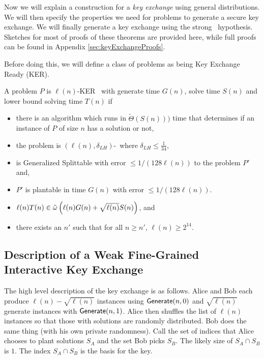 

Now we will explain a construction for a \emph{key exchange} using general distributions. We will then specify the properties we need for problems to generate a secure key exchange. We will finally generate a key exchange using the strong \zkclique~hypothesis. Sketches for most of proofs of these theorems are provided here, while full proofs can be found in Appendix \ref{sec:keyExchangeProofs}.

\newcommand{\keyER}{KER}

Before doing this, we will define a class of problems as being Key Exchange Ready (KER).

\begin{definition}
	A problem $P$ is $\ell(n)$-\keyER~ with generate time $G(n)$, solve time $S(n)$ and lower bound solving time $T(n)$ if
	\begin{itemize}
		\item there is an algorithm which runs in $\tilde\Theta(S(n)))$ time that determines if an instance of $P$ of size $n$ has a solution or not,
		\item the problem is $(\ell(n), \delta_{LH})$-\ACLH~where $\delta_{LH} \le \frac 1 {34}$,
		\item is Generalized Splittable with error $\leq 1/(128 \ell(n))$ to the problem $P'$ and,
		\item $P'$ is plantable in time $G(n)$ with error $\leq 1/(128 \ell(n))$.
		\item $\ell(n)T(n) \in \~ \omega\left(\ell(n)G(n) + \sqrt{\ell(n)}S(n)\right)$, and
		\item there exists an $n'$ such that for all $n \ge n'$, $\ell(n) \ge 2^{14}$.
	\end{itemize}
\end{definition}

\subsection{Description of a Weak Fine-Grained Interactive Key Exchange}

The high level description of the key exchange is as follows. Alice and Bob each produce $\ell(n) - \sqrt{\ell(n)}$ instances using $\Generate(n,0)$ and $\sqrt{\ell(n)}$ generate instances with $\Generate(n,1)$. Alice then shuffles the list of $\ell(n)$ instances so that those with solutions are randomly distributed. Bob does the same thing (with his own private randomness). Call the set of indices that Alice chooses to plant solutions $S_A$ and the set Bob picks $S_B$. The likely size of $S_A \cap S_B$ is $1$. The index $S_A \cap S_B$ is the basis for the key.

